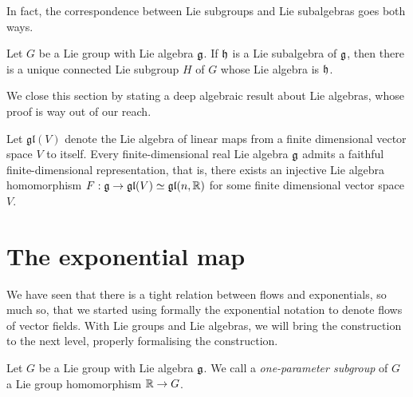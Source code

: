 In fact, the correspondence between Lie subgroups and Lie subalgebras goes both ways.

\begin{theorem}
  Let $G$ be a Lie group with Lie algebra $\mathfrak{g}$. If $\mathfrak{h}$ is a Lie subalgebra of $\mathfrak{g}$, then there is a unique connected Lie subgroup $H$ of $G$ whose Lie algebra is $\mathfrak{h}$.
\end{theorem}

We close this section by stating a deep algebraic result about Lie algebras, whose proof is way out of our reach.
\begin{theorem}
  Let $\mathfrak{gl}(V)$ denote the Lie algebra of linear maps from a finite dimensional vector space $V$ to itself.
  Every finite-dimensional real Lie algebra $\mathfrak{g}$ admits a faithful finite-dimensional representation, that is, there exists an injective Lie algebra homomorphism $F: \mathfrak{g} \to \mathfrak{gl}(V)\simeq\mathfrak{gl}(n,\mathbb{R})$ for some finite dimensional vector space $V$.
\end{theorem}

\section{The exponential map}

We have seen that there is a tight relation between flows and exponentials, so much so, that we started using formally the exponential notation to denote flows of vector fields.
With Lie groups and Lie algebras, we will bring the construction to the next level, properly formalising the construction.

\begin{definition}
  Let $G$ be a Lie group with Lie algebra $\mathfrak{g}$.
  We call a \emph{one-parameter subgroup} of $G$ a Lie group homomorphism $\mathbb{R}\to G$.
\end{definition}

